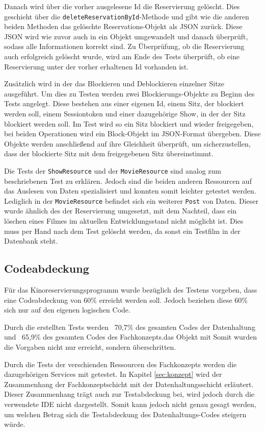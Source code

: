 Danach wird über die vorher ausgelesene Id die Reservierung gelöscht. Dies geschieht über die \texttt{deleteReservationById}-Methode und gibt wie die anderen beiden Methoden das gelöschte Reservations-Objekt als \acs{JSON} zurück.
Diese \acs{JSON} wird wie zuvor auch in ein Objekt umgewandelt und danach überprüft, sodass alle Informationen korrekt sind. 
Zu Überprüfung, ob die Reservierung auch erfolgreich gelöscht wurde, wird am Ende des Tests überprüft, ob eine Reservierung unter der vorher erhaltenen Id vorhanden ist. 

Zusätzlich wird in der  das Blockieren und Deblockieren einzelner Sitze ausgeführt. Um dies zu Testen werden zwei Blockierungs-Objekte zu Beginn des Tests angelegt.
Diese bestehen aus einer eigenen Id, einem Sitz, der blockiert werden soll, einem Sessiontoken und einer dazugehörige Show, in der der Sitz blockiert werden soll. 
Im Test wird so ein Sitz blockiert und wieder freigegeben, bei beiden Operationen wird ein Block-Objekt im \acs{JSON}-Format übergeben. 
Diese Objekte werden anschließend auf ihre Gleichheit überprüft, um sicherzustellen, dass der blockierte Sitz mit dem freigegebenen Sitz übereinstimmt.

Die Tests der \texttt{ShowResource} und der \texttt{MovieResource} sind analog zum beschriebenen Test zu erklären. 
Jedoch sind die beiden anderen Ressourcen auf das Auslesen von Daten spezialisiert und konnten somit leichter getestet werden. 
Lediglich in der \texttt{MovieResource} befindet sich ein weiterer \texttt{Post} von Daten. 
Dieser wurde ähnlich des  der Reservierung umgesetzt, mit dem Nachteil, dass ein löschen eines Filmes im aktuellen Entwicklungsstand nicht möglicht ist. Dies muss per Hand nach dem Test gelöscht werden, da sonst ein Testfilm in der Datenbank steht.

\subsection{Codeabdeckung} 

Für das Kinoreservierungsprogramm wurde bezüglich des Testens vorgeben, dass eine Codeabdeckung von 60\% erreicht werden soll.
Jedoch beziehen diese 60\% sich nur auf den eigenen logischen Code. 

Durch die erstellten Tests werden ~70,7\% des gesamten Codes der Datenhaltung und ~65,9\% des gesamten Codes des Fachkonzepts.das Objekt mit 
Somit wurden die Vorgaben nicht nur erreicht, sondern überschritten.

Durch die Tests der verschienden Ressourcen des Fachkonzepts werden die dazugehörigen Services mit getestet.
In Kapitel \vref{sec:konzept} wird der Zusammenhang der Fachkonzeptschicht mit der Datenhaltungsschicht erläutert. 
Dieser Zusammenhang trägt auch zur Testabdeckung bei, wird jedoch durch die verwendete \acs{IDE} nicht dargestellt.
Somit kann jedoch nicht genau gesagt werden, um welchen Betrag sich die Testabdeckung des Datenhaltungs-Codes steigern würde.